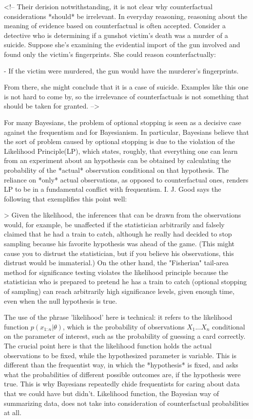 \textless{}!-- Their derision notwithstanding, it is not clear why
counterfactual considerations *should* be irrelevant. In everyday
reasoning, reasoning about the meaning of evidence based on
counterfactual is often accepted. Consider a detective who is
determining if a gunshot victim's death was a murder of a suicide.
Suppose she's examining the evidential import of the gun involved and
found only the victim's fingerprints. She could reason counterfactually:

- If the victim were murdered, the gun would have the murderer's
fingerprints.

From there, she might conclude that it is a case of suicide. Examples
like this one is not hard to come by, so the irrelevance of
counterfactuals is not something that should be taken for granted.
--\textgreater{}

For many Bayesians, the problem of optional stopping is seen as a
decisive case against the frequentism and for Bayesianism. In
particular, Bayesians believe that the sort of problem caused by
optional stopping is due to the violation of the Likelihood
Principle(LP), which states, roughly, that everything one can learn from
an experiment about an hypothesis can be obtained by calculating the
probability of the *actual* observation conditional on that hypothesis.
The reliance on *only* actual observations, as opposed to counterfactual
ones, renders LP to be in a fundamental conflict with frequentism. I. J.
Good says the following that exemplifies this point well:

\textgreater{} Given the likelihood, the inferences that can be drawn
from the observations would, for example, be unaffected if the
statistician arbitrarily and falsely claimed that he had a train to
catch, although he really had decided to stop sampling because his
favorite hypothesis was ahead of the game. (This might cause you to
distrust the statistician, but if you believe his observations, this
distrust would be immaterial.) On the other hand, the "Fisherian"
tail-area method for significance testing violates the likelihood
principle because the statistician who is prepared to pretend he has a
train to catch (optional stopping of sampling) can reach arbitrarily
high significance levels, given enough time, even when the null
hypothesis is true.

The use of the phrase 'likelihood' here is technical: it refers to the
likelihood function \(p(x_{1:n}|\theta)\), which is the probability of
observations \(X_1...X_n\) conditional on the parameter of interest,
such as the probability of guessing a card correctly. The crucial point
here is that the likelihood function holds the actual observations to be
fixed, while the hypothesized parameter is variable. This is different
than the frequentist way, in which the *hypothesis* is fixed, and asks
what the probabilities of different possible outcomes are, if the
hypothesis were true. This is why Bayesians repeatedly chide
frequentists for caring about data that we could have but didn't.
Likelihood function, the Bayesian way of summarizing data, does not take
into consideration of counterfactual probabilities at all.

